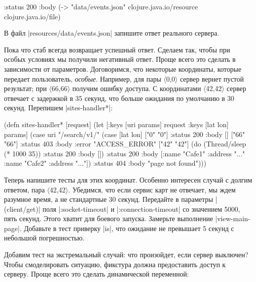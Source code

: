 \begin{english}
  \begin{clojure}
{:status 200
 :body (-> "data/events.json"
           clojure.java.io/resource
           clojure.java.io/file)}
  \end{clojure}
\end{english}

В файл \spverb|resources/data/events.json| запишите ответ реального сервера.

Пока что стаб всегда возвращает успешный ответ. Сделаем так, чтобы при особых
условиях мы получили негативный ответ. Проще всего это сделать в зависимости от
параметров. Договоримся, что некоторые координаты, которые передает
пользователь, \emph{особые}. Например, для пары $\langle$0,0$\rangle$ сервер
вернет пустой результат; при $\langle$66,66$\rangle$ получим ошибку доступа. С
координатами $\langle$42,42$\rangle$ сервер отвечает с задержкой в 35 секунд,
что больше ожидания по умолчанию в 30 секунд. Перепишем \spverb|sites-handler*|:

\begin{english}
  \begin{clojure}
(defn sites-handler* [request]
  (let [{:keys [uri params]} request
        {:keys [lat lon]} params]
    (case uri
      "/search/v1/"
      (case [lat lon]
        ["0" "0"]   {:status 200 :body []}
        ["66" "66"] {:status 403 :body {:error "ACCESS_ERROR"}}
        ["42" "42"] (do (Thread/sleep (* 1000 35))
                        {:status 200 :body []})
        {:status 200
         :body [{:name "Cafe1" :address "..."}
                {:name "Cafe2" :address "..."}]})
      {:status 404 :body "page not found"})))
  \end{clojure}
\end{english}

Теперь напишите тесты для этих координат. Особенно интересен случай с долгим
ответом, пара $\langle$42,42$\rangle$. Убедимся, что если сервис карт не
отвечает, мы ждем разумное время, а не стандартные 30 секунд. Передайте в
параметры \spverb|(client/get)| поля \spverb|:socket-timeout| и
\spverb|:connection-timeout| со значением 5000, пять секунд. Этого хватит для
боевого запуска. Замерьте выполнение \spverb|view-main-page|. Добавьте в тест
приверку \spverb|is|, что ожидание не превышает 5 секунд с небольшой
погрешностью.

Добавим тест на экстремальный случай: что произойдет, если сервер выключен?
Чтобы смоделировать ситуацию, фикстура должна предоставить доступ к
серверу. Проще всего это сделать динамической переменной:

